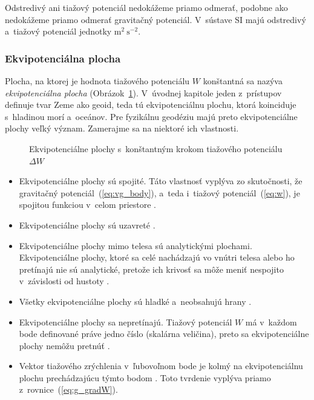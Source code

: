 \documentclass[a4paper, 12pt]{book}
\begin{document}
Odstredivý ani tiažový potenciál nedokážeme priamo odmerať, podobne ako 
nedokážeme priamo odmerať gravitačný potenciál.  V~sústave SI majú odstredivý 
a~tiažový potenciál jednotky $\mathrm{m}^2 \ \mathrm{s}^{-2}$.

\subsubsection{Ekvipotenciálna plocha}

Plocha, na ktorej je hodnota tiažového potenciálu $W$ konštantná sa nazýva 
\emph{ekvipotenciálna plocha} (Obrázok~\ref{fig:equipotential_surfaces}).  
V~úvodnej kapitole jeden z~prístupov definuje tvar Zeme ako geoid, teda tú 
ekvipotenciálnu plochu, ktorá koinciduje s~hladinou morí a~oceánov.  Pre 
fyzikálnu geodéziu majú preto ekvipotenciálne plochy veľký význam.  Zamerajme 
sa na niektoré ich vlastnosti.

\begin{figure}
\centering

\caption{Ekvipotenciálne plochy s~konštantným krokom tiažového potenciálu 
$\Delta W$}
\label{fig:equipotential_surfaces}
\end{figure}

\begin{itemize}
\item Ekvipotenciálne plochy sú spojité.  Táto vlastnosť vyplýva zo 
skutočnosti, že gravitačný potenciál~(\ref{eq:vg_body}), a~teda i~tiažový 
potenciál~(\ref{eq:w}), je spojitou funkciou v~celom priestore 
\citep{Janak2006}.

\item Ekvipotenciálne plochy sú uzavreté \citep{VanicekGeodesy}.

\item Ekvipotenciálne plochy mimo telesa sú analytickými plochami.  
Ekvipotenciálne plochy, ktoré sa celé nachádzajú vo vnútri telesa alebo ho 
pretínajú nie sú analytické, pretože ich krivosť sa môže meniť nespojito 
v~závislosti od hustoty \citep{MoritzPhysicalGeodesy}.

\item Všetky ekvipotenciálne plochy sú hladké a~neobsahujú hrany 
\citep{MoritzPhysicalGeodesy}.

\item Ekvipotenciálne plochy sa nepretínajú.  Tiažový potenciál $W$ má v~každom 
bode definované práve jedno číslo (skalárna veličina), preto sa ekvipotenciálne 
plochy nemôžu pretnúť \citep{MacMillan1930}.

\item Vektor tiažového zrýchlenia v~ľubovoľnom bode je kolmý na ekvipotenciálnu 
plochu prechádzajúcu týmto bodom \citep{MoritzPhysicalGeodesy}.  Toto tvrdenie 
vyplýva priamo z~rovnice~(\ref{eq:g_gradW}).
\end{itemize}
\end{document}
